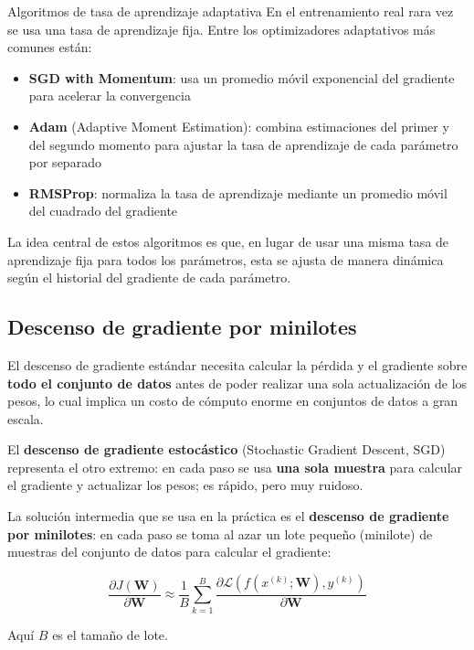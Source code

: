 \documentclass[a4paper]{article}
\begin{document}
\begin{importantbox}{Algoritmos de tasa de aprendizaje adaptativa}
En el entrenamiento real rara vez se usa una tasa de aprendizaje fija. Entre los optimizadores adaptativos más comunes están:
\begin{itemize}
\item \textbf{SGD with Momentum}: usa un promedio móvil exponencial del gradiente para acelerar la convergencia
\item \textbf{Adam} (Adaptive Moment Estimation): combina estimaciones del primer y del segundo momento para ajustar la tasa de aprendizaje de cada parámetro por separado
\item \textbf{RMSProp}: normaliza la tasa de aprendizaje mediante un promedio móvil del cuadrado del gradiente
\end{itemize}
La idea central de estos algoritmos es que, en lugar de usar una misma tasa de aprendizaje fija para todos los parámetros, esta se ajusta de manera dinámica según el historial del gradiente de cada parámetro.
\end{importantbox}

\subsection{Descenso de gradiente por minilotes}

El descenso de gradiente estándar necesita calcular la pérdida y el gradiente sobre \textbf{todo el conjunto de datos} antes de poder realizar una sola actualización de los pesos, lo cual implica un costo de cómputo enorme en conjuntos de datos a gran escala.

El \textbf{descenso de gradiente estocástico} (Stochastic Gradient Descent, SGD) representa el otro extremo: en cada paso se usa \textbf{una sola muestra} para calcular el gradiente y actualizar los pesos; es rápido, pero muy ruidoso.

La solución intermedia que se usa en la práctica es el \textbf{descenso de gradiente por minilotes}: en cada paso se toma al azar un lote pequeño (minilote) de muestras del conjunto de datos para calcular el gradiente:

$$\frac{\partial J(\mathbf{W})}{\partial \mathbf{W}} \approx \frac{1}{B}\sum_{k=1}^{B}\frac{\partial \mathcal{L}(f(x^{(k)}; \mathbf{W}), y^{(k)})}{\partial \mathbf{W}}$$

Aquí $B$ es el tamaño de lote.
\end{document}
